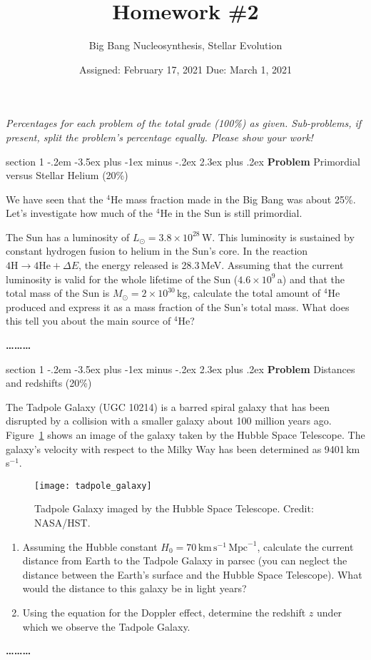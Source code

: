 \documentclass[letterpaper,12pt,twoside=false,DIV=11]{scrartcl}
\makeatletter
\newcommand{\topic}{\author}
\newenvironment{problem}{\@startsection
    {section}
    {1}
    {-.2em}
    {-3.5ex plus -1ex minus -.2ex}
    {2.3ex plus .2ex}
    {
        \pagebreak[3] %
        \noindent\sffamily\bfseries Problem
    }
}
{
    \begin{center}\large\bfseries\ldots\ldots\ldots\end{center}
}
\providecommand{\ex}[1]{\ensuremath{^{#1}}}
\makeatother
\begin{document}
\title{Homework \#2}
\topic{Big Bang Nucleosynthesis, Stellar Evolution}
\date{Assigned: February 17, 2021 \qquad Due: March 1, 2021}

\maketitle
\thispagestyle{fancy}


\noindent\emph{Percentages for each problem of the total grade (100\%) as given. Sub-problems, if present, split the problem's percentage equally. Please show your work!}

\begin{problem}{Primordial versus Stellar Helium (20\%)}

We have seen that the \ex{4}He mass fraction made in the Big Bang was about 25\%. Let's investigate how much of the \ex{4}He in the Sun is still primordial. 

The Sun has a luminosity of $L_\odot = 3.8\times 10^{28}$\,W. This luminosity is sustained by constant hydrogen fusion to helium in the Sun's core. In the reaction $4\mathrm{H} \longrightarrow 4\mathrm{He} + \Delta E$, the energy released is 28.3\,MeV. Assuming that the current luminosity is valid for the whole lifetime of the Sun ($4.6\times 10^{9}$\,a) and that the total mass of the Sun is $M_\odot = 2\times 10^{30}$\,kg, calculate the total amount of \ex{4}He produced and express it as a mass fraction of the Sun's total mass. What does this tell you about the main source of \ex{4}He?

\end{problem}

\begin{problem}{Distances and redshifts (20\%)}

The Tadpole Galaxy (UGC 10214) is a barred spiral galaxy that has been disrupted by a collision with a smaller galaxy about 100 million years ago. Figure~\ref{fig:tadpole_galaxy} shows an image of the galaxy taken by the Hubble Space Telescope. 
The galaxy's velocity with respect to the Milky Way has been determined as 9401\,km\,s$^{-1}$. 
\begin{figure}[tb]
    \centering
    \texttt{[image: tadpole\_galaxy]}
    \caption{Tadpole Galaxy imaged by the Hubble Space Telescope. Credit: NASA/HST.}
    \label{fig:tadpole_galaxy}
\end{figure}

\begin{enumerate}
    \item Assuming the Hubble constant $H_0 = 70\,\mathrm{km}\,\mathrm{s}^{-1}\,\mathrm{Mpc}^{-1}$, calculate the current distance from Earth to the Tadpole Galaxy in parsec (you can neglect the distance between the Earth's surface and the Hubble Space Telescope). What would the distance to this galaxy be in light years?
    \item Using the equation for the Doppler effect, determine the redshift $z$ under which we observe the Tadpole Galaxy.
\end{enumerate}

\end{problem}
\end{document}
